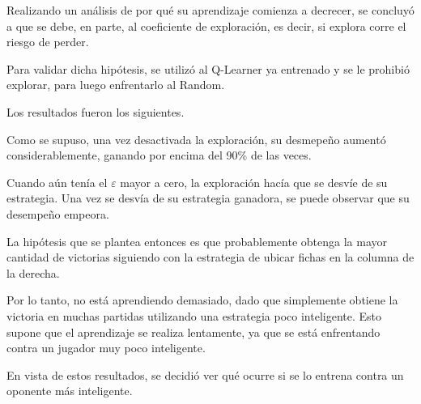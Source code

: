 Realizando un análisis de por qué su aprendizaje comienza a decrecer, se concluyó a que se debe, en parte, al coeficiente de exploración, es decir, si explora corre el riesgo de  perder.

Para validar dicha hipótesis, se utilizó al Q-Learner ya entrenado y se le prohibió explorar, para luego enfrentarlo al Random.

Los resultados fueron los siguientes.


Como se supuso, una vez desactivada la exploración, su desmepeño aumentó considerablemente, ganando por encima del 90\% de las veces.

Cuando aún tenía el $\varepsilon$ mayor a cero, la exploración hacía que se desvíe de su estrategia. Una vez se desvía de su estrategia ganadora, se puede observar que su desempeño empeora.

La hipótesis que se plantea entonces es que probablemente obtenga la mayor cantidad de victorias siguiendo con la estrategia de ubicar fichas en la columna de la derecha.

Por lo tanto, no está aprendiendo demasiado, dado que simplemente obtiene la victoria en muchas partidas utilizando una estrategia poco inteligente. Esto supone que el aprendizaje se realiza lentamente, ya que se está enfrentando contra un jugador muy poco inteligente.

En vista de estos resultados, se decidió ver qué ocurre si se lo entrena contra un oponente más inteligente.
